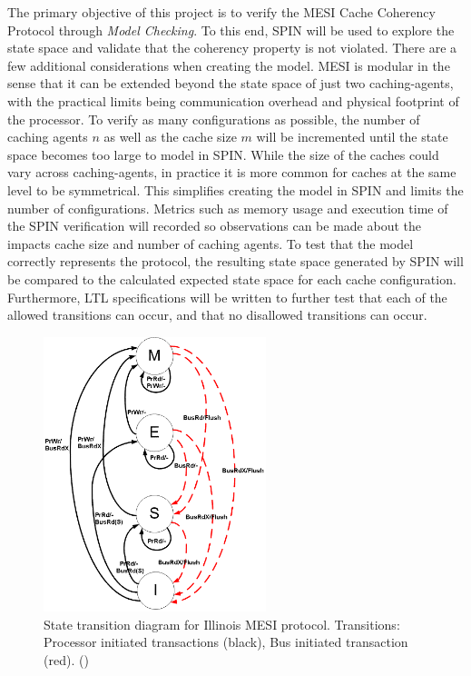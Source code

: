 \documentclass[12pt]{article}
\begin{document}
The primary objective of this project is to verify the MESI Cache Coherency Protocol through \textit{Model Checking}. To this end, SPIN will be used to explore the state space and validate that the coherency property is not violated. There are a few additional considerations when creating the model. MESI is modular in the sense that it can be extended beyond the state space of just two caching-agents, with the practical limits being communication overhead and physical footprint of the processor. To verify as many configurations as possible, the number of caching agents $n$ as well as the cache size $m$ will be incremented until the state space becomes too large to model in SPIN. While the size of the caches could vary across caching-agents, in practice it is more common for caches at the same level to be symmetrical. This simplifies creating the model in SPIN and limits the number of configurations. Metrics such as memory usage and execution time of the SPIN verification will recorded so observations can be made about the impacts cache size and number of caching agents. To test that the model correctly represents the protocol, the resulting state space generated by SPIN will be compared to the calculated expected state space for each cache configuration. Furthermore, LTL specifications will be written to further test that each of the allowed transitions can occur, and that no disallowed transitions can occur.
 

\begin{figure}
    \centering
    \includegraphics[height=8cm]{images/State_transition_diagram_for_the_Illinois_MESI_protocol.png}
    \caption{State transition diagram for Illinois MESI protocol. Transitions: Processor initiated transactions (black), Bus initiated transaction (red). (\cite{culler1998})}
    \label{fig:statetransitiondiagram}
\end{figure}
\end{document}
